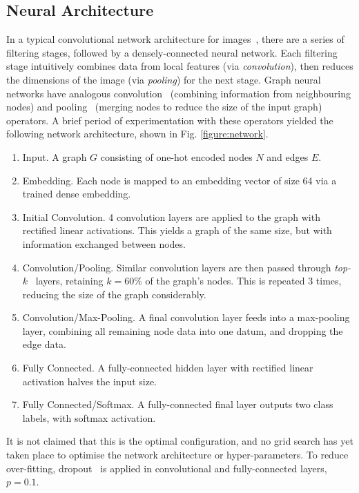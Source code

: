 \documentclass{llncs}
\begin{document}
\subsection{Neural Architecture}
In a typical convolutional network architecture for images~\cite{cnn}, there are a series of filtering stages, followed by a densely-connected neural network.
Each filtering stage intuitively combines data from local features (via \emph{convolution}), then reduces the dimensions of the image (via \emph{pooling}) for the next stage.
Graph neural networks have analogous convolution~\cite{gcn} (combining information from neighbouring nodes) and pooling~\cite{top-k-pooling} (merging nodes to reduce the size of the input graph) operators.
A brief period of experimentation with these operators yielded the following network architecture, shown in Fig. \ref{figure:network}.
\begin{enumerate}
	\item Input. A graph \(G\) consisting of one-hot encoded nodes \(N\) and edges \(E\).
	\item Embedding. Each node is mapped to an embedding vector of size 64 via a trained dense embedding.
	\item Initial Convolution. 4 convolution layers are applied to the graph with rectified linear activations. This yields a graph of the same size, but with information exchanged between nodes.
	\item Convolution/Pooling. Similar convolution layers are then passed through \emph{top-\(k\)}~\cite{top-k-pooling} layers, retaining \(k = 60\%\) of the graph's nodes. This is repeated 3 times, reducing the size of the graph considerably.
	\item Convolution/Max-Pooling. A final convolution layer feeds into a max-pooling layer, combining all remaining node data into one datum, and dropping the edge data.
	\item Fully Connected. A fully-connected hidden layer with rectified linear activation halves the input size.
	\item Fully Connected/Softmax. A fully-connected final layer outputs two class labels, with softmax activation.
\end{enumerate}
It is not claimed that this is the optimal configuration, and no grid search has yet taken place to optimise the network architecture or hyper-parameters. 
To reduce over-fitting, dropout~\cite{dropout} is applied in convolutional and fully-connected layers, \(p = 0.1\).
\end{document}
